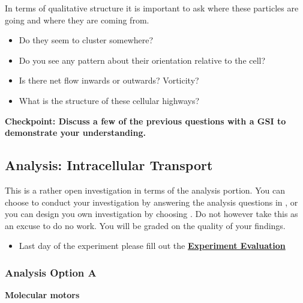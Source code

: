 \documentclass{../lab}
\begin{document}
In terms of qualitative structure it is important to ask where these particles are going and where they are coming from.

\begin{itemize}
    \item Do they seem to cluster somewhere?

    \item Do you see any pattern about their orientation relative to the cell?

    \item Is there net flow inwards or outwards? Vorticity?

    \item What is the structure of these cellular highways?
\end{itemize}

\textbf{Checkpoint: Discuss a few of the previous questions with a GSI to demonstrate your understanding.}

\subsection{Analysis: Intracellular Transport}

This is a rather open investigation in terms of the analysis portion. You can choose to conduct your investigation by answering the analysis questions in , or you can design you own investigation by choosing . Do not however take this as an excuse to do no work. You will be graded on the quality of your findings.

\begin{itemize}
    \item Last day of the experiment please fill out the \href{\ExperimentEvaluation}{\textbf{Experiment Evaluation}}

\end{itemize}

\subsubsection{Analysis Option A}

\textbf{Molecular motors}
\end{document}

